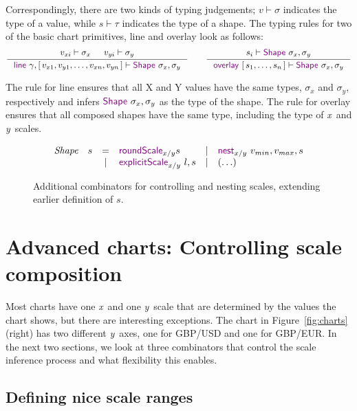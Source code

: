 \documentclass{jfp}
\newcommand{\X}{\emph{x}\ }
\newcommand{\Y}{\emph{y}\ }
\newcommand{\kvd}[1]{\textnormal{\textcolor{kvdclr}{\sffamily #1}}}
\begin{document}
\vspace{-1.25em}
\noindent
Correspondingly, there are two kinds of typing judgements; $v\vdash \sigma$ indicates the type of a
value, while $s\vdash \tau$ indicates the type of a shape. The typing rules for two of the
basic chart primitives, \kvd{line} and \kvd{overlay} look as follows:
%
\begin{equation*}
\inference
  {v_{xi} \vdash \sigma_x & v_{yi} \vdash \sigma_y}
  {\kvd{line}~\gamma, [\,v_{x1}, v_{y1}, \ldots, v_{xn}, v_{yn}\,] \vdash \kvd{Shape}~\sigma_x, \sigma_y}
\qquad
\inference
  {s_i \vdash \kvd{Shape}~\sigma_x, \sigma_y}
  {\kvd{overlay}~[\,s_1, \ldots, s_n\,] \vdash \kvd{Shape}~\sigma_x, \sigma_y}
\end{equation*}

\vspace{-0.5em}
\noindent
The rule for \kvd{line} ensures that all X and Y values have the same types, $\sigma_x$ and $\sigma_y$,
respectively and infers $\kvd{Shape}~\sigma_x, \sigma_y$ as the type of the shape. The rule for
\kvd{overlay} ensures that all composed shapes have the same type, including the type of \X and \Y scales.

\begin{figure}
\begin{equation*}
\begin{array}{rclcl}
\textit{Shape}~~~s & = & \kvd{roundScale}_{x/y} s      &|& \kvd{nest}_{x/y}~v_{min}, v_{max}, s \\
   & | & \kvd{explicitScale}_{x/y}~l, s &|&  (\ldots)
\end{array}
\end{equation*}
\caption{Additional combinators for controlling and nesting scales, extending earlier definition of $s$.}
\label{fig:control}
\end{figure}

\section{Advanced charts: Controlling scale composition}
\label{sec:fancy}

Most charts have one \X and one \Y scale that are determined by the values the chart shows,
but there are interesting exceptions. The chart in Figure~\ref{fig:charts} (right)
has two different \Y axes, one for GBP/USD and one for GBP/EUR. In the next two sections, we look at
three combinators that control the scale inference process and what flexibility this enables.

\subsection{Defining nice scale ranges}
\end{document}
